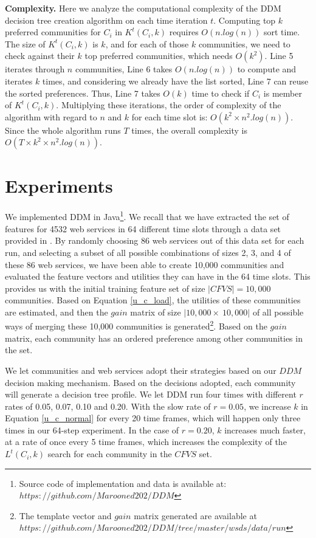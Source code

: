 \textbf{Complexity.} Here we analyze the computational complexity of the DDM decision tree creation algorithm on each time iteration $t$. Computing top $k$ preferred communities for $C_i$ in $K^t(C_i, k)$ requires $O(n.log(n))$ sort time. The size of $K^t(C_i, k)$ is $k$, and for each of those $k$ communities, we need to check against their $k$ top preferred communities, which needs $O(k^2)$. Line 5 iterates through $n$ communities, Line 6 takes $O(n.log(n))$ to compute and iterates $k$ times, and considering we already have the list sorted, Line 7 can reuse the sorted preferences. Thus, Line 7 takes $O(k)$ time to check if $C_i$ is member of $K^t(C_i, k)$. Multiplying these iterations, the order of complexity of the algorithm with regard to $n$ and $k$ for each time slot is: $O(k^2 \times n^2.log(n))$. Since the whole algorithm runs $T$ times, the overall complexity is $O(T \times k^2 \times n^2.log(n))$.

\section{Experiments}\label{s:experiments}
We implemented DDM in Java\footnote{Source code of implementation and data is available at: $https://github.com/Marooned202/DDM$}. We recall that we have extracted the set of features for 4532 web services in 64 different time slots through a data set provided in \cite{10.1109/ISSRE.2011.17}. By randomly choosing 86 web services out of this data set for each run, and selecting a subset of all possible combinations of sizes 2, 3, and 4 of these 86 web services, we have been able to create 10,000 communities and evaluated the feature vectors and utilities they can have in the 64 time slots. This provides us with the initial training feature set of size $|CFVS| = 10,000$ communities. Based on Equation \ref{u_c_load}, the utilities of these communities are estimated, and then the $gain$ matrix of size $|10,000 \times~ 10,000|$ of all possible ways of merging these 10,000 communities is generated\footnote {The template vector and $gain$ matrix generated are available at $https://github.com/Marooned202/DDM/tree/master/wsds/data/run$}. Based on the $gain$ matrix, each community has an ordered preference among other communities in the set.

We let communities and web services adopt their strategies based on our $DDM$ decision making mechanism. Based on the decisions adopted, each community will generate a decision tree profile. We let DDM run four times with different $r$ rates of 0.05, 0.07, 0.10 and 0.20. With the slow rate of $r = 0.05$, we increase $k$ in Equation \ref{u_c_normal} for every 20 time frames, which will happen only three times in our 64-step experiment. In the case of $r = 0.20$, $k$ increases much faster, at a rate of once every 5 time frames, which increases the complexity of the $L^t(C_i,k)$ search for each community in the $CFVS$ set.

